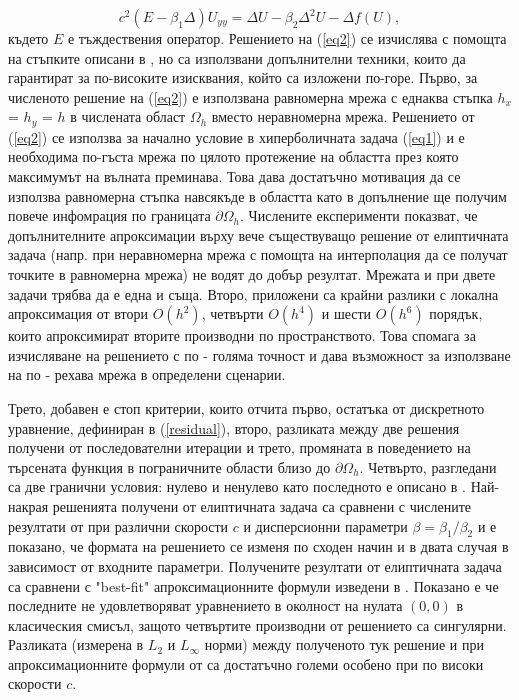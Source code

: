 \documentclass{article}
\newcommand{\rf}[1]{(\ref{#1})}
\begin{document}
\begin{equation}\label{eq2}
c^2 (E-\beta_1 \Delta) U_{yy} = \Delta U -\beta_2 \Delta^2 U - \Delta f(U),
\end{equation}
където $E$ е тъждествения оператор. Решението на \rf{eq2} се изчислява с помощта на стъпките описани в \cite{Ch2012,chd-chr}, но са използвани допълнителни техники, които да гарантират за по-високите изисквания, който са изложени по-горе.
Първо, за численото решение на \rf{eq2} е използвана равномерна мрежа с еднаква стъпка $h_x$ = $h_y$ = $h$ в числената област $\Omega_h$ вместо неравномерна мрежа. Решението от \rf{eq2} се използва за начално условие в хиперболичната задача \rf{eq1} и е необходима по-гъста мрежа по цялото протежение на областта през която максимумът на вълната преминава. Това дава достатъчно мотивация да се използва равномерна стъпка навсякъде в областта като в допълнение ще получим повече инфомрация по границата $\partial \Omega_h$. Числените експерименти показват, че допълнителните апроксимации върху вече съществуващо решение от елиптичната задача (напр. при неравномерна мрежа с помощта на интерполация да се получат точките в равномерна мрежа) не водят до добър резултат. Мрежата и при двете задачи трябва да е една и съща.
Второ, приложени са крайни разлики с локална апроксимация от втори $O(h^2)$, четвърти $O(h^4)$ и шести $O(h^6)$ порядък, които апроксимират вторите производни по пространството. Това спомага за изчисляване на решението с по - голяма точност и дава възможност за използване на по - рехава мрежа в определени сценарии.

Трето, добавен е стоп критерии, които отчита първо, остатъка от дискретното уравнение, дефиниран в \rf{residual}, второ, разликата между две решения получени от последователни итерации и трето, промяната в поведението на търсената функция в пограничните области близо до $\partial \Omega_h$.
Четвърто, разгледани са две гранични условия: нулево и ненулево като последното е описано в \cite{bnd}.
Най-накрая решенията получени от елиптичната задача са сравнени с числените резултати от \cite{Ch2012,Ch2011} при различни скорости $c$ и дисперсионни параметри $\beta =\beta_1  / \beta_2$ и е показано, че формата на решението се изменя по сходен начин и в двата случая в зависимост от входните параметри. Получените резултати от елиптичната задача са сравнени с "best-fit" апроксимационните формули изведени в \cite{Ch2011}. Показано е че последните не удовлетворяват уравнението в околност на нулата $(0,0)$ в класическия смисъл, защото четвъртите производни от решението са сингулярни. Разликата (измерена в $L_2$ и $L_\infty$ норми) между полученото тук решение и при апроксимационните формули от \cite{Ch2011} са достатъчно големи особено при по високи скорости $c$.
\end{document}
